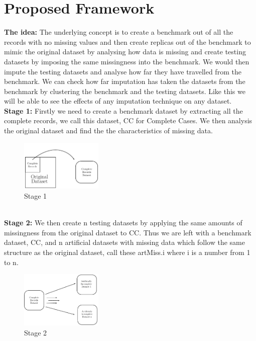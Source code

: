\documentclass{IEEEconf}
\begin{document}
	\section{Proposed Framework} %
	\label{sec:proposed_framework}
		\textbf{The idea:} The underlying concept is to create a benchmark out of all the records with no missing values and then create replicas out of the benchmark to mimic the original dataset by analysing how data is missing and create testing datasets by imposing the same missingness into the benchmark. We would then impute the testing datasets and analyse how far they have travelled from the benchmark. We can check how far imputation has taken the datasets from the benchmark by clustering the benchmark and the testing datasets. Like this we will be able to see the effects of any imputation technique on any dataset. 
		\\
		\indent \textbf{Stage 1:}
		Firstly we need to create a benchmark dataset by extracting all the complete records, we call this dataset, CC for Complete Cases. We then analysis the original dataset and find the the characteristics of missing data.
		\begin{figure}[!ht]
			\caption{Stage 1}
			\centering
			\includegraphics[width=0.35\textwidth]{stage1.pdf}
		\end{figure}
		\\
		\indent \textbf{Stage 2:}
		We then create n testing datasets by applying the same amounts of missingness from the original dataset to CC. Thus we are left with a benchmark dataset, CC, and n artificial datasets with missing data which follow the same structure as the original dataset, call these artMiss.i where i is a number from 1 to n. 
		\begin{figure}[!ht]
			\caption{Stage 2}
			\centering
			\includegraphics[width=0.35\textwidth]{stage22.pdf}
		\end{figure}
\end{document}
